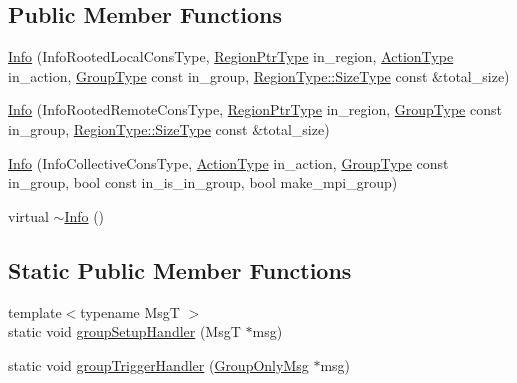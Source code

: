 \subsection*{Public Member Functions}
\begin{DoxyCompactItemize}
\item 
\hyperlink{structvt_1_1group_1_1_info_ac02a7e3cd2ae8fe4cfd91974dcfdfb50}{Info} (Info\+Rooted\+Local\+Cons\+Type, \hyperlink{structvt_1_1group_1_1_info_rooted_a127ac5ebcfb9871621c1f66dba481c0b}{Region\+Ptr\+Type} in\+\_\+region, \hyperlink{namespacevt_ae0a5a7b18cc99d7b732cb4d44f46b0f3}{Action\+Type} in\+\_\+action, \hyperlink{namespacevt_a27b5e4411c9b6140c49100e050e2f743}{Group\+Type} const in\+\_\+group, \hyperlink{structvt_1_1group_1_1region_1_1_region_a9bb381adf31111aae34dbc644bad6c1f}{Region\+Type\+::\+Size\+Type} const \&total\+\_\+size)
\item 
\hyperlink{structvt_1_1group_1_1_info_a8439da4014d2ab7dcc5549b8ed2f9675}{Info} (Info\+Rooted\+Remote\+Cons\+Type, \hyperlink{structvt_1_1group_1_1_info_rooted_a127ac5ebcfb9871621c1f66dba481c0b}{Region\+Ptr\+Type} in\+\_\+region, \hyperlink{namespacevt_a27b5e4411c9b6140c49100e050e2f743}{Group\+Type} const in\+\_\+group, \hyperlink{structvt_1_1group_1_1region_1_1_region_a9bb381adf31111aae34dbc644bad6c1f}{Region\+Type\+::\+Size\+Type} const \&total\+\_\+size)
\item 
\hyperlink{structvt_1_1group_1_1_info_a87a6ef1f2feb855de0ba58d87471ecb8}{Info} (Info\+Collective\+Cons\+Type, \hyperlink{namespacevt_ae0a5a7b18cc99d7b732cb4d44f46b0f3}{Action\+Type} in\+\_\+action, \hyperlink{namespacevt_a27b5e4411c9b6140c49100e050e2f743}{Group\+Type} const in\+\_\+group, bool const in\+\_\+is\+\_\+in\+\_\+group, bool make\+\_\+mpi\+\_\+group)
\item 
virtual \hyperlink{structvt_1_1group_1_1_info_a04f1febedc844247ef36c17146f5ccfc}{$\sim$\+Info} ()
\end{DoxyCompactItemize}
\subsection*{Static Public Member Functions}
\begin{DoxyCompactItemize}
\item 
{\footnotesize template$<$typename MsgT $>$ }\\static void \hyperlink{structvt_1_1group_1_1_info_a8479ae53fed60033acca267e0918aa6f}{group\+Setup\+Handler} (MsgT $\ast$msg)
\item 
static void \hyperlink{structvt_1_1group_1_1_info_a4b457782f9b23a2ad6df129d6c4b1502}{group\+Trigger\+Handler} (\hyperlink{namespacevt_1_1group_a864fcf6bc821eacf8350bf4ad15e51b3}{Group\+Only\+Msg} $\ast$msg)
\end{DoxyCompactItemize}
